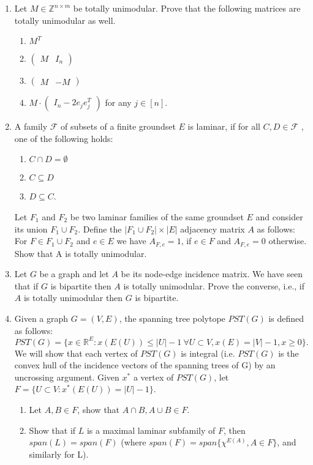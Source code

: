 \documentclass[11pt]{article}
\institute{\'Ecole Polytechnique F\'ed\'erale de Lausanne}
\newcommand{\setR}{\mathbb{R}}
\newcommand{\setZ}{\mathbb{Z}}
\begin{document}
\makeheader

\begin{enumerate}[1)]

\item Let $M ∈ \setZ^{n×m}$ be totally unimodular. Prove that the following matrices are totally unimodular as well. 
\begin{enumerate}
\item $M^T$
\item $\begin{pmatrix} M & I_n \end{pmatrix}$
\item $\begin{pmatrix} M & -M \end{pmatrix}$
\item $M\cdot \begin{pmatrix} I_n− 2e_j e_j^T\end{pmatrix}$ for any $j \in [n]$. 
\end{enumerate}




\item A family $\mathcal{F}$ of subsets of a finite groundset $E$ is laminar, if for all $C ,D ∈ \mathcal{F}$ , one of the following holds:
\begin{enumerate}
\item $C ∩ D = \emptyset$ 
\item $C ⊆ D$
\item $D ⊆ C$.
\end{enumerate}
Let $F_1$ and $F_2$ be two laminar families of the same groundset $E$ and consider its union
$F_1 ∪ F_2$. Define the $|F_1 ∪ F_2| × |E |$ adjacency matrix $A$ as follows: For $F ∈ F_1 ∪ F_2$ and $e ∈ E$
we have $A_{F,e} = 1$, if $e ∈ F$ and $A_{F,e} = 0$ otherwise.\\
Show that A is totally unimodular.


\item Let $G$ be a graph and let $A$ be its node-edge incidence matrix. We have seen that if $G$ is
bipartite then $A$ is totally unimodular. Prove the converse, i.e., if $A$ is totally unimodular then $G$
is bipartite.


\item Given a graph $G=(V,E)$, the spanning tree polytope $PST(G)$ is defined as follows:
$$PST (G) = \{x∈\setR^E : x(E(U)) ≤|U|−1 \ ∀U ⊂V, x(E) = |V|−1, x≥0\}.$$
We will show that each vertex of $PST(G)$ is integral (i.e. $PST (G)$ is the convex hull of the incidence
vectors of the spanning trees of G) by an uncrossing argument. 
Given $x^*$ a vertex of $PST (G)$, let $F= \{U ⊂V : x^*(E(U)) = |U|−1\}$.
\begin{enumerate}
\item Let $A,B ∈F$, show that $A∩B,A∪B ∈F$.
\item Show that if $L$ is a maximal laminar subfamily of $F$, then $span(L) = span(F)$ (where
$span(F) = span\{χ^{E(A)},A∈F\}$, and similarly for L).
\end{enumerate}







\end{enumerate}



  
\end{document}
